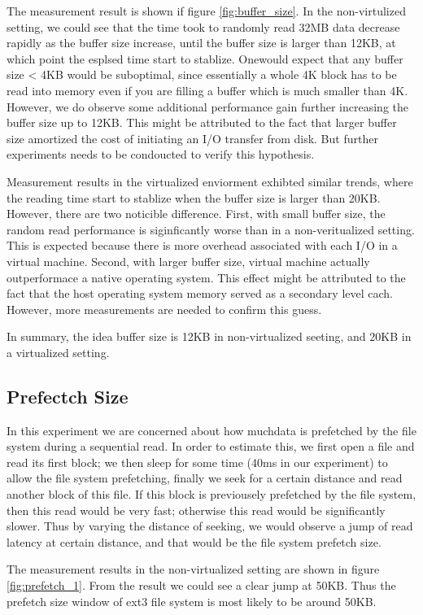 The measurement result is shown if figure \ref{fig:buffer_size}. In the non-virtulized setting, we could see that the time took to randomly read 32MB data decrease rapidly as the buffer size increase, until the buffer size is larger than 12KB, at which point the esplsed time start to stablize. Onewould expect that any buffer size < 4KB would be suboptimal, since essentially a whole 4K block has to be read into memory even if you are filling a buffer which is much smaller than 4K. However, we do observe some additional performance gain further increasing the buffer size up to 12KB. This might be attributed to the fact that larger buffer size amortized the cost of initiating an I/O transfer from disk. But further experiments needs to be condoucted to verify this hypothesis. 

Measurement results in the virtualized enviorment exhibted similar trends, where the reading time start to stablize when the buffer size is larger than 20KB. However, there are two noticible difference. First, with small buffer size, the random read performance is siginficantly worse than in a non-veritualized setting. This is expected because there is more overhead associated with each I/O in a virtual machine. Second, with larger buffer size, virtual machine actually outperformace a native operating system. This effect might be attributed to the fact that the host operating system memory served as a secondary level cach. However, more measurements are needed to confirm this guess. 

In summary, the idea buffer size is 12KB in non-virtualized seeting, and 20KB in a virtualized setting.

\subsection{Prefectch Size}
In this experiment we are concerned about how muchdata is prefetched by the file system during a sequential read. In order to estimate this, we first open a file and read its first block; we then sleep for some time (40ms in our experiment) to allow the file system prefetching, finally we seek for a certain distance and read another block of this file. If this block is previousely prefetched by the file system, then this read would be very fast; otherwise this read would be significantly slower. Thus by varying the distance of seeking, we would observe a jump of read latency at certain distance, and that would be the file system prefetch size. 

The measurement results in the non-virtualized setting are shown in figure \ref{fig:prefetch_1}. From the result we could see a clear jump at 50KB. Thus the prefetch size window of ext3 file system is most likely to be around 50KB.

